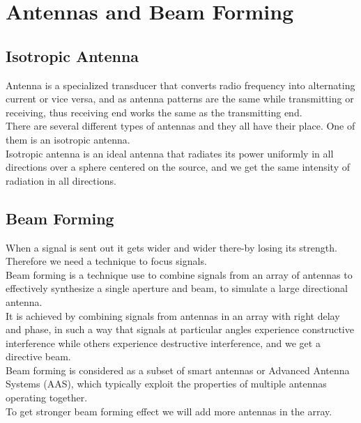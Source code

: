 \section{Antennas and Beam Forming}

\subsection{Isotropic Antenna}
Antenna is a specialized transducer that converts radio frequency into alternating current or vice versa, and as antenna patterns are the same while transmitting or receiving, thus receiving end works the same as the transmitting end.\\
There are several different types of antennas and they all have their place. One of them is an isotropic antenna.\\
Isotropic antenna is an ideal antenna that radiates its power uniformly in all directions over a sphere centered on the source, and we get the same intensity of radiation in all directions.

\subsection{Beam Forming}
When a signal is sent out it gets wider and wider there-by losing its strength. Therefore we need a technique to focus signals.\\
Beam forming is a technique use to combine signals from an array of antennas to effectively synthesize a single aperture and beam, to simulate a large directional antenna.\\
It is achieved by combining signals from antennas in an array with right delay and phase, in such a way that signals at particular angles experience constructive interference while others experience destructive interference, and we get a directive beam.\\
Beam forming is considered as a subset of smart antennas or Advanced Antenna Systems (AAS), which typically exploit the properties of multiple antennas operating together.\\
To get stronger beam forming effect we will add more antennas in the array.

